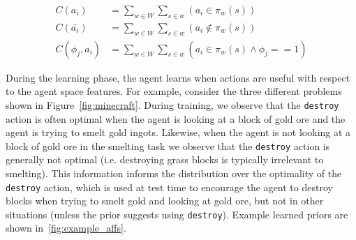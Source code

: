 \documentclass[11pt]{article}
\begin{document}
\begin{align}
C(a_i) &= \sum_{w \in W} \sum_{s \in w} (a_i \in \pi_w(s)) \\
C(\bar{a_i}) &= \sum_{w \in W} \sum_{s \in w} (a_i \not \in \pi_w(s) ) \\
C(\phi_j, a_i) &= \sum_{w \in W} \sum_{s \in w} (a_i  \in \pi_w(s) \wedge \phi_j == 1)
\end{align}

During the learning phase, the agent learns when actions are useful
with respect to the agent space features.  For example, consider the three different
problems shown in Figure~\ref{fig:minecraft}.  During training, we observe
that the \texttt{destroy} action is often optimal when the agent is
looking at a block of gold ore and the agent is trying to smelt gold
ingots.  Likewise, when the agent is not looking at a block of gold
ore in the smelting task we observe that the \texttt{destroy} action
is generally not optimal (i.e. destroying grass blocks is typically
irrelevant to smelting).  This information informs the distribution
over the optimality of the \texttt{destroy} action, which is used at
test time to encourage the agent to destroy blocks when trying to
smelt gold and looking at gold ore, but not in other situations
(unless the prior suggests using \texttt{destroy}). Example
learned priors are shown in~\ref{fig:example_affs}.
\end{document}

